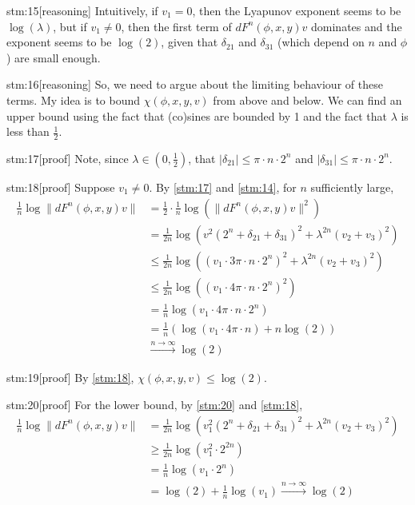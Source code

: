 \begin{stm}{stm:15}[reasoning]
Intuitively, if $v_1 = 0$, then the Lyapunov exponent seems to be $\log(\lambda)$, but if $v_1 \neq 0$, then the first term of $dF^n(\phi, x, y)v$ dominates and the exponent seems to be $\log(2)$, given that $\delta_{21}$ and $\delta_{31}$ (which depend on $n$ and $\phi$) are small enough.
\end{stm}

\begin{stm}{stm:16}[reasoning]
So, we need to argue about the limiting behaviour of these terms. My idea is to bound $\chi(\phi, x, y, v)$ from above and below. We can find an upper bound using the fact that (co)sines are bounded by 1 and the fact that $\lambda$ is less than $\frac{1}{2}$.
\end{stm}

\begin{stm}{stm:17}[proof]
Note, since $\lambda \in (0, \frac{1}{2})$, that $|\delta_{21}| \le \pi \cdot n \cdot 2^n$ and $|\delta_{31}| \le \pi \cdot n \cdot 2^n$.
\end{stm}

\begin{stm}{stm:18}[proof]
Suppose $v_1 \neq 0$. By \ref{stm:17} and \ref{stm:14}, for $n$ sufficiently large,
\begin{align*}
\frac{1}{n} \log \| dF^n(\phi, x, y)v \| 
&= \frac{1}{2} \cdot \frac{1}{n} \log \left( \| dF^n(\phi, x, y)v \|^2 \right) \\
&= \frac{1}{2n} \log \left( v^2 (2^n + \delta_{21} + \delta_{31})^2 + \lambda^{2n}(v_2 + v_3)^2 \right) \\
&\le \frac{1}{2n} \log \left( (v_1 \cdot 3 \pi \cdot n \cdot 2^n)^2 + \lambda^{2n}(v_2 + v_3)^2 \right) \\
&\le \frac{1}{2n} \log \left( (v_1 \cdot 4 \pi \cdot n \cdot 2^n)^2 \right) \\
&= \frac{1}{n} \log (v_1 \cdot 4 \pi \cdot n \cdot 2^n) \\
&= \frac{1}{n} \left( \log(v_1 \cdot 4 \pi \cdot n) + n \log(2) \right)\\
&\xrightarrow{n \to \infty} \log(2)
\end{align*}
\end{stm}

\begin{stm}{stm:19}[proof]
By \ref{stm:18}, $\chi(\phi, x, y, v) \le \log(2)$.
\end{stm}

\begin{stm}{stm:20}[proof]
For the lower bound, by \ref{stm:20} and \ref{stm:18},
\begin{align*}
\frac{1}{n} \log \| dF^n(\phi, x, y)v \| 
&= \frac{1}{2n} \log \left( v_1^2(2^n + \delta_{21} + \delta_{31})^2 + \lambda^{2n}(v_2 + v_3)^2 \right) \\
&\ge \frac{1}{2n} \log \left( v_1^2 \cdot 2^{2n} \right) \\
&= \frac{1}{n} \log (v_1 \cdot 2^n) \\
&= \log(2) + \frac{1}{n} \log(v_1) \xrightarrow{n \to \infty} \log(2)
\end{align*}
\end{stm}



